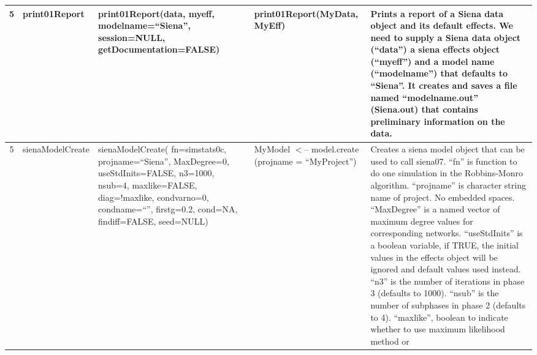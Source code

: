 \documentclass[a4paper,fleqn]{article}
\newcommand{\+}{\, + \,}
\begin{document}
{\begin{landscape}
\begin{longtable}{c | p{3cm} | p{5.2cm} | p{4.2cm} | p{8.5cm} }
5 & print01Report & print01Report(data, myeff, \newline
modelname=``Siena'',\newline
session=NULL, \newline
getDocumentation=FALSE) & print01Report(MyData, MyEff) & Prints a
report of a Siena data object and its default effects. We need to supply a
Siena data object (``data'') a siena effects object (``myeff'') and a model
name (``modelname'') that defaults to ``Siena''. It creates and saves a file
named ``modelname.out'' (Siena.out) that contains preliminary information
on the data.\\
\hline

5 & sienaModelCreate & sienaModelCreate(\newline
fn=simstats0c,\newline
projname=``Siena'', \newline
MaxDegree=0, \newline
useStdInits=FALSE, n3=1000, \newline
nsub=4, maxlike=FALSE, \newline
diag=!maxlike, \newline
condvarno=0, \newline
condname=``'', firstg=0.2, \newline
cond=NA, findiff=FALSE, \newline
seed=NULL) &
\newline
MyModel $<$-- model.create \newline
(projname = \newline
``MyProject'') & Creates a siena model
object that can be used to call siena07. ``fn'' is function to do one
simulation in the Robbins-Monro algorithm.
``projname'' is character string name of
project. No embedded spaces. ``MaxDegree'' is a named vector of maximum degree
values for corresponding networks. ``useStdInits'' is a boolean variable, if
TRUE, the initial values in the effects object will be ignored and default
values used instead. ``n3'' is the number of iterations in phase 3 (defaults to
1000). ``nsub'' is the number of subphases in phase 2 (defaults to 4).
``maxlike'', boolean to indicate whether to use maximum likelihood method or

\end{longtable}
\end{landscape}}
\end{document}
